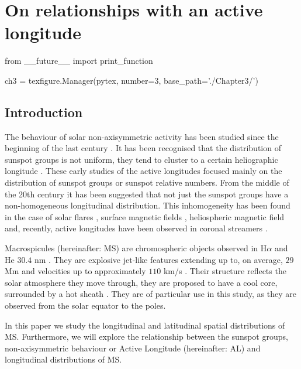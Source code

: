 \chapter{On relationships with an active longitude}\label{ch:3}  %

\begin{pycode}[chapter3]
from __future__ import print_function

ch3 = texfigure.Manager(pytex, number=3, base_path='./Chapter3/')
\end{pycode}

\section{Introduction}
The behaviour of solar non-axisymmetric activity has been studied since the beginning of the last century \citep{Chidambara}. It has been recognised that the distribution of sunspot groups is not uniform, they tend to cluster to a certain heliographic longitude \citep{Bumba,Balthasar,Wilkinson}. These early studies of the active longitudes focused mainly on the distribution of sunspot groups or sunspot relative numbers. From the middle of the 20th century it has been suggested that not just the sunspot groups have a non-homogeneous longitudinal distribution. This inhomogeneity has been found in the case of solar flares \citep{Zhang}, surface magnetic fields \citep{Benevolenskaya}, heliospheric magnetic field \citep{Mursula} and, recently, active longitudes have been observed in coronal streamers \citep{Jing}.

\newpage
Macrospicules (hereinafter: MS) are chromospheric objects observed in H$\alpha$ and He $30.4$ nm \citep{Bohlin,Wang,Murawski,Scullion}. They are explosive jet-like features extending up to, on average, $29$ Mm and velocities up to approximately $110$ km/s \citep{Zaqarashvili}. Their structure reflects the solar atmosphere they move through, they are proposed to have a cool core, surrounded by a hot sheath \citep{Parenti}. They are of particular use in this study, as they are observed from the solar equator to the poles. 

In this paper we study the longitudinal and latitudinal spatial distributions of MS. Furthermore, we will explore the relationship between the sunspot groups, non-axisymmetric behaviour or Active Longitude (hereinafter: AL) and longitudinal distributions of MS.

